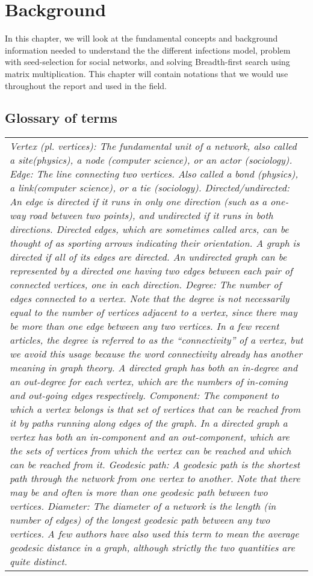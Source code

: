 \chapter{Background} 

In this chapter, we will look at the fundamental concepts and background information needed to understand the the different infections model, problem with seed-selection for social networks, and solving Breadth-first search using matrix multiplication. This chapter will contain notations that we would use throughout the report and used in the field. 

\section{Glossary of terms}
\begin{center}
    \begin{tabular}{| l |}
    	\hline
    	\it{Vertex} (pl. vertices): The fundamental unit of a network, also called a site(physics), a node (computer science), or an actor (sociology).
		\it{Edge}: The line connecting two vertices. Also called a bond (physics), a link(computer science), or a tie (sociology).
		\it{Directed/undirected}: An edge is directed if it runs in only one direction (such as a one-way road between two points), and undirected if it runs in both directions. Directed edges, which are sometimes called arcs, can be thought of as sporting arrows indicating their orientation. A graph is directed if all of its edges are directed. An undirected graph can be represented by a directed one having two edges between each pair of connected vertices, one in each direction.
		\it{Degree}: The number of edges connected to a vertex. Note that the degree is not necessarily equal to the number of vertices adjacent to a vertex, since there may be more than one edge between any two vertices. In a few recent articles, the degree is referred to as the “connectivity” of a vertex, but we avoid this usage because the word connectivity already has another meaning in graph theory. A directed graph has both an in-degree and an out-degree for each vertex, which are the numbers of in-coming and out-going edges respectively.
		\it{Component}: The component to which a vertex belongs is that set of vertices that can be reached from it by paths running along edges of the graph. In a directed graph a vertex has both an in-component and an out-component, which are the sets of vertices from which the vertex can be reached and which can be reached from it.
		\it{Geodesic path}: A geodesic path is the shortest path through the network from one vertex to another. Note that there may be and often is more than one geodesic path between two vertices.
		\it{Diameter}: The diameter of a network is the length (in number of edges) of the longest geodesic path between any two vertices. A few authors have also used this term to mean the average geodesic distance in a graph, although strictly the two quantities are quite distinct.
    
    \hline
    \end{tabular}
\end{center}


